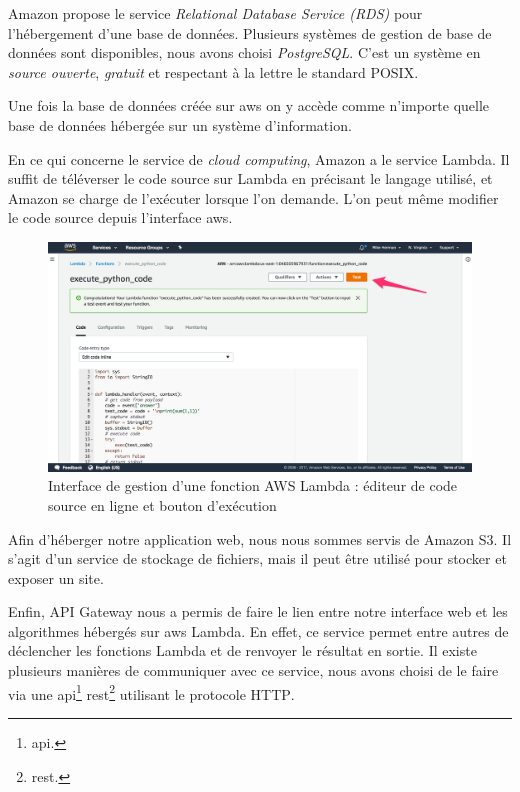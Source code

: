 Amazon propose le service \textit{Relational Database Service (RDS)}\cite{noauthor_aws_nodate-2} pour l'hébergement d'une base de données. Plusieurs systèmes de gestion de base de données sont disponibles, nous avons choisi \emph{PostgreSQL}. C'est un système en \emph{source ouverte}, \emph{gratuit} et respectant à la lettre le standard \textsc{POSIX}\cite{noauthor_open_nodate}.

Une fois la base de données créée sur \gls{aws} on y accède comme n'importe quelle base de données hébergée sur un système d'information.

En ce qui concerne le service de \textit{cloud computing}, Amazon a le service Lambda\cite{noauthor_aws_nodate-1}. Il suffit de téléverser le code source sur Lambda en précisant le langage utilisé, et Amazon se charge de l'exécuter lorsque l'on demande. L'on peut même modifier le code source depuis l'interface \gls{aws}.

  \begin{figure}[H]
    \centering
    \includegraphics[width=1\linewidth]{img/aws_lambda_ui.png}
    \caption{Interface de gestion d'une fonction AWS Lambda : éditeur de code source en ligne et bouton d'exécution}
  \end{figure}

Afin d'héberger notre application web, nous nous sommes servis de Amazon S3. Il s'agit d'un service de stockage de fichiers, mais il peut être utilisé pour stocker et exposer un site.

Enfin,
API Gateway\cite{noauthor_conception_nodate-1}
nous a permis de faire le lien entre notre interface web et les algorithmes hébergés sur \gls{aws} Lambda.
En effet, ce service permet entre autres de déclencher les fonctions Lambda et de renvoyer le résultat en sortie. Il existe plusieurs manières de communiquer avec ce service, nous avons choisi de le faire via une
\gls{api}\footnote{\glsdesc{api}.}
\gls{rest}\footnote{\glsdesc{rest}.}
utilisant le protocole \textsc{HTTP}.


